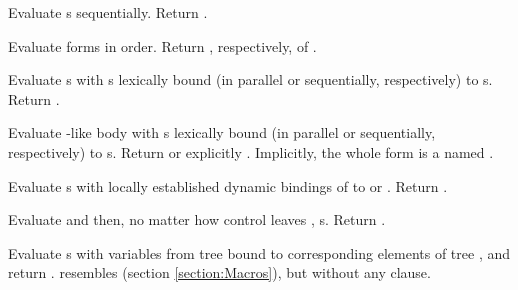 \begin{LIST}{1cm}
  {\label{:progn}
    Evaluate s sequentially. Return
    .
  }

  {
  Evaluate forms in order. Return ,
  respectively, of . 
  }

  {
    Evaluate s with s lexically bound (in parallel or
    sequentially, respectively) to s. Return
    . 
  }

  {
    Evaluate -like body with s lexically bound (in
    parallel or sequentially, respectively) to s. Return
    \retval{\NIL} or explicitly .
    Implicitly, the whole form is a  named \NIL. 
  }

  {
    Evaluate s with locally established dynamic bindings of
     to  or \NIL. Return . 
  }

  {
    Evaluate  and then, no matter how control leaves
    , s. Return . 
  }

  {
  Evaluate s with variables from tree
   bound to corresponding elements of tree
  , and return .  resembles 
  (section \ref{section:Macros}), but without any 
  clause. 
  }


\end{LIST}
